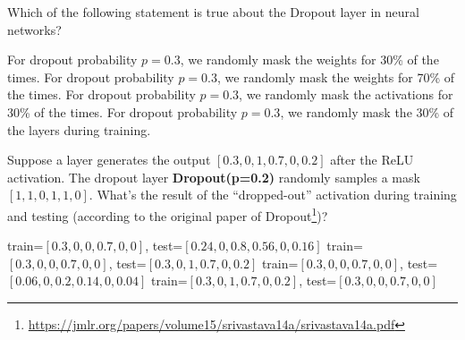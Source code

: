 \begin{questions}
    \question[2] Which of the following statement is true about the Dropout layer in neural networks?
    \begin{checkboxes}
        \choice For dropout probability $p=0.3$, we randomly mask the weights for 30\% of the times. 
        \choice For dropout probability $p=0.3$, we randomly mask the weights for 70\% of the times.
        \choice For dropout probability $p=0.3$, we randomly mask the activations for 30\% of the times.
        \choice For dropout probability $p=0.3$, we randomly mask the 30\% of the layers during training.
    \end{checkboxes}
    
    \clearpage
    \question[2] Suppose a layer generates the output $[0.3, 0, 1, 0.7, 0, 0.2]$ after the ReLU activation. The dropout layer \textbf{Dropout(p=0.2)} randomly samples a mask $[1, 1, 0, 1, 1, 0]$. What's the result of the ``dropped-out'' activation during training and testing (according to the original paper of Dropout\footnote{\url{https://jmlr.org/papers/volume15/srivastava14a/srivastava14a.pdf}})?
    \begin{checkboxes}
        \choice train=$[0.3, 0, 0, 0.7, 0, 0]$, test=$[0.24, 0, 0.8, 0.56, 0, 0.16]$
        \choice train=$[0.3, 0, 0, 0.7, 0, 0]$, test=$[0.3, 0, 1, 0.7, 0, 0.2]$
        \choice train=$[0.3, 0, 0, 0.7, 0, 0]$, test=$[0.06, 0, 0.2, 0.14, 0, 0.04]$
        \choice train=$[0.3, 0, 1, 0.7, 0, 0.2]$, test=$[0.3, 0, 0, 0.7, 0, 0]$
    \end{checkboxes}
\end{questions}

